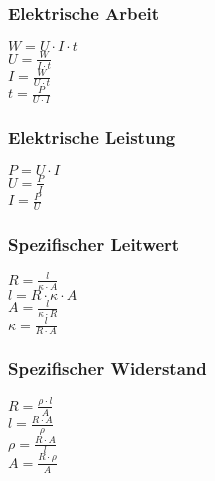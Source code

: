 \subsubsection{Elektrische Arbeit} 
\begin{minipage}{0.45\textwidth} 
$ W = U\cdot I\cdot t $\\ 
$ U = \frac{W}{I\cdot t} $\\ 
$ I = \frac{W}{U\cdot t} $\\ 
$ t = \frac{ P}{U\cdot I} $\\ 
\end{minipage} 
\begin{minipage}{0.45\textwidth} 
 
\end{minipage} 
\subsubsection{Elektrische Leistung} 
\begin{minipage}{0.45\textwidth} 
$ P = U\cdot I $\\ 
$ U = \frac{P}{I} $\\ 
$ I = \frac{P}{U} $\\ 
\end{minipage} 
\begin{minipage}{0.45\textwidth} 
 
\end{minipage} 
\subsubsection{Spezifischer Leitwert} 
\begin{minipage}{0.45\textwidth} 
$ R = \frac{ l}{\kappa \cdot A} $\\ 
$ l = R\cdot \kappa \cdot A $\\ 
$ A = \frac{l}{\kappa \cdot R} $\\ 
$ \kappa  = \frac{ l}{R\cdot A} $\\ 
\end{minipage} 
\begin{minipage}{0.45\textwidth} 
 
\end{minipage} 
\subsubsection{Spezifischer Widerstand} 
\begin{minipage}{0.45\textwidth} 
$ R = \frac{\rho \cdot l}{ A} $\\ 
$ l = \frac{R\cdot A}{ \rho } $\\ 
$ \rho  = \frac{R\cdot A}{ l} $\\ 
$ A = \frac{R\cdot \rho }{ A} $\\ 
\end{minipage} 
\begin{minipage}{0.45\textwidth} 
 
\end{minipage} 
